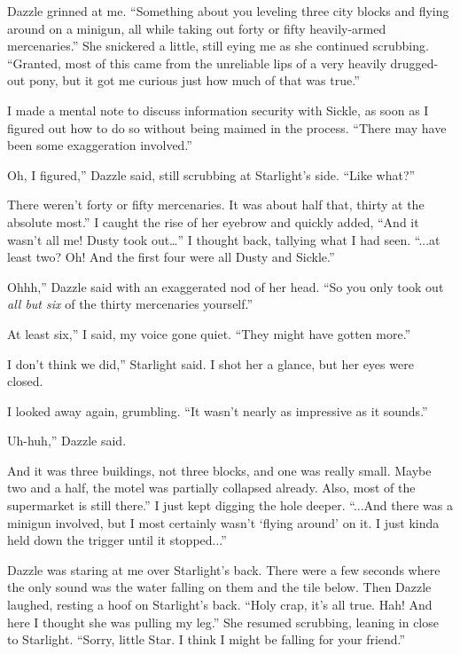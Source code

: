 Dazzle grinned at me. “Something about you leveling three city blocks and flying around on a minigun, all while taking out forty or fifty heavily-armed mercenaries.” She snickered a little, still eying me as she continued scrubbing. “Granted, most of this came from the unreliable lips of a very heavily drugged-out pony, but it got me curious just how much of that was true.”

I made a mental note to discuss information security with Sickle, as soon as I figured out how to do so without being maimed in the process. “There may have been some exaggeration involved.”

\leavevmode{}Oh, I figured,” Dazzle said, still scrubbing at Starlight’s side. “Like what?”

\leavevmode{}There weren’t forty or fifty mercenaries. It was about half that, thirty at the absolute most.” I caught the rise of her eyebrow and quickly added, “And it wasn’t all me! Dusty took out…” I thought back, tallying what I had seen. “...at least two? Oh! And the first four were all Dusty and Sickle.”

\leavevmode{}Ohhh,” Dazzle said with an exaggerated nod of her head. “So you only took out \textit{all but six} of the thirty mercenaries yourself.”

\leavevmode{}At least six,” I said, my voice gone quiet. “They might have gotten more.”

\leavevmode{}I don’t think we did,” Starlight said. I shot her a glance, but her eyes were closed.

I looked away again, grumbling. “It wasn’t nearly as impressive as it sounds.”

\leavevmode{}Uh-huh,” Dazzle said.

\leavevmode{}And it was three buildings, not three blocks, and one was really small. Maybe two and a half, the motel was partially collapsed already. Also, most of the supermarket is still there.” I just kept digging the hole deeper. “...And there was a minigun involved, but I most certainly wasn’t ‘flying around’ on it. I just kinda held down the trigger until it stopped...”

Dazzle was staring at me over Starlight’s back. There were a few seconds where the only sound was the water falling on them and the tile below. Then Dazzle laughed, resting a hoof on Starlight’s back. “Holy crap, it’s all true. Hah! And here I thought she was pulling my leg.” She resumed scrubbing, leaning in close to Starlight. “Sorry, little Star. I think I might be falling for your friend.”

